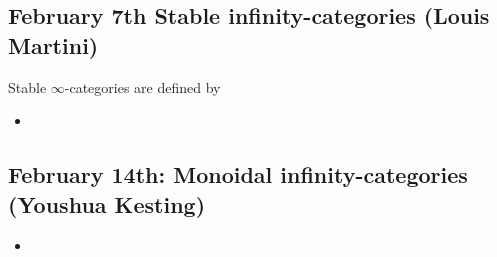 \documentclass{amsart}
\theoremstyle{definition}
\theoremstyle{remark}
\begin{document}
\subsection{February 7th Stable infinity-categories (Louis Martini)
}

Stable $\infty$-categories are defined by 

\begin{itemize}
\item 
\end{itemize}

\subsection{February 14th: Monoidal infinity-categories (Youshua Kesting)}

\begin{itemize}
\item 
\end{itemize}

\printbibliography
\end{document}
